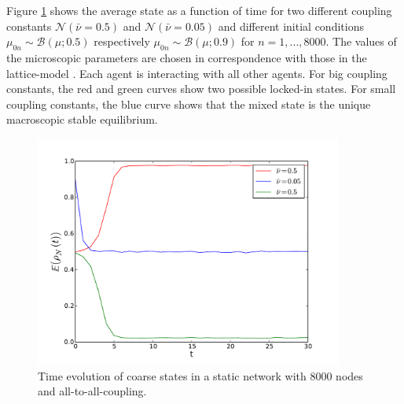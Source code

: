 \documentclass[]{article}
\title{}
\author{}
\begin{document}



Figure \ref{fig:time_evolution} shows the average state as a function of time for two different coupling constants $\mathcal{N}(\bar{\nu}=0.5)$ and  $\mathcal{N}(\bar{\nu}=0.05)$ and different initial conditions $ \mu_{0 n} \sim \mathcal{B} ( \mu; 0.5) $ respectively $ \mu_{0n} \sim\mathcal{B} ( \mu; 0.9 ) $ for $n=1,...,8000$.     %
 The values of the microscopic parameters are chosen in correspondence with those in the lattice-model \cite{avitabile14}. Each agent is interacting with all other agents. For big coupling constants, the red and green curves show two possible locked-in states. For small coupling constants, the blue curve shows that the mixed state is the unique macroscopic stable equilibrium.

\begin{figure}


\includegraphics[width=0.9\textwidth]{time_evolution_N_8000.pdf}
\caption{Time evolution of coarse states in a static network with 8000 nodes and all-to-all-coupling.}
\label{fig:time_evolution}
\end{figure}



\end{document}
